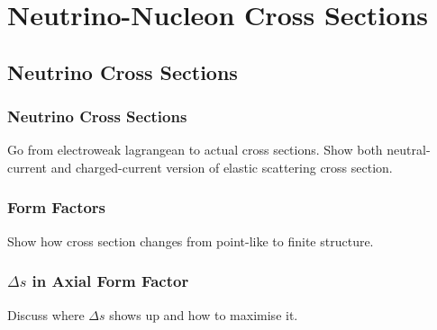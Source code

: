 \section{Neutrino-Nucleon Cross Sections} \label{theory}
\hspace{\parindent}

\subsection{Neutrino Cross Sections}\label{probe}
  \subsubsection{Neutrino Cross Sections}
    Go from electroweak lagrangean to actual cross sections. Show both
    neutral-current and charged-current version of elastic scattering cross
    section.
  \subsubsection{Form Factors}
    Show how cross section changes from point-like to finite structure.
  \subsubsection{$\Delta s$ in Axial Form Factor}
    Discuss where $\Delta s$ shows up and how to maximise it.

